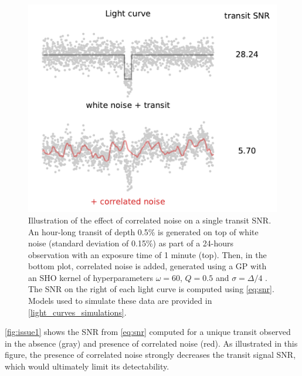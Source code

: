 \documentclass[modern,linenumbers]{aastex631}
\begin{document}
\begin{figure}[H]
    \begin{centering}
        \includegraphics[width=0.6\linewidth]{../workflows/plot_issues/figures/issue1.pdf}
        \caption{Illustration of the effect of correlated noise on a single transit SNR. An hour-long transit of depth 0.5\% is generated on top of white noise (standard deviation of 0.15\%) as part of a 24-hours observation with an exposure time of 1 minute (top). Then, in the bottom plot, correlated noise is added, generated using a GP with an SHO kernel of hyperparameters $\omega=60$, $Q=0.5$ and $\sigma=\Delta/4$ . The SNR on the right of each light curve is computed using \autoref{eq:snr}. Models used to simulate these data are provided in \autoref{light_curves_simulations}.}
        \label{fig:issue1}
    \end{centering}
\end{figure}
\autoref{fig:issue1} shows the SNR from \autoref{eq:snr} computed for a unique transit observed in the absence (gray) and presence of correlated noise (red). As illustrated in this figure, the presence of correlated noise strongly decreases the transit signal SNR, which would ultimately limit its detectability.
\end{document}
